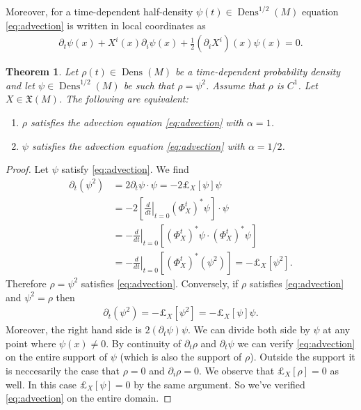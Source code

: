 \documentclass[letterpaper, 10 pt, conference]{ieeeconf}
\newtheorem{thm}{Theorem}[section]
\DeclareMathOperator{\Dens}{Dens}
\begin{document}
  Moreover, for a time-dependent half-density $\psi(t) \in \Dens^{1/2}(M)$
  equation \eqref{eq:advection} is written in local coordinates as
  \begin{align*}
    \partial_t \psi(x) 
    + X^i(x) \partial_i \psi(x) 
    + \frac{1}{2} (\partial_i X^i)(x) \psi(x) = 0.
  \end{align*}
  \begin{thm} \label{thm:advection}
    Let $\rho(t) \in \Dens(M)$ be a time-dependent probability density
    and let $\psi \in \Dens^{1/2}(M)$ be such that $\rho = \psi^2$.
    Assume that $\rho$ is $C^1$.
    Let $X \in \mathfrak{X}(M)$.
    The following are equivalent:
    \begin{enumerate}
      \item $\rho$ satisfies the advection equation \eqref{eq:advection} with $\alpha = 1$.
      \item $\psi$ satisfies the advection equation \eqref{eq:advection} with $\alpha = 1/2$.
    \end{enumerate}
  \end{thm}
  \begin{proof}
    Let $\psi$ satisfy \eqref{eq:advection}.
    We find
    \begin{align*}
      \partial_t (\psi^2) &= 2 \partial_t\psi \cdot \psi
      =-2 \pounds_X[\psi] \psi \\
      &= - 2 \left[ \left.\frac{d}{dt}\right|_{t=0}
         (\Phi_X^t)^* \psi \right] \cdot \psi \\
      &= - \left. \frac{d}{dt} \right|_{t=0}
        \left[ (\Phi_X^t)^* \psi \cdot (\Phi_X^t)^* \psi \right]\\
      &= - \left. \frac{d}{dt} \right|_{t=0}
        \left[ (\Phi_X^t)^* (\psi^2) \right] 
      = - \pounds_X[\psi^2].
    \end{align*}
    Therefore $\rho = \psi^2$ satisfies \eqref{eq:advection}.
    Conversely, if $\rho$ satisfies \eqref{eq:advection}
    and $\psi^2 = \rho$ then
    \begin{align*}
      \partial_t (\psi^2) = - \pounds_X[\psi^2] = - \pounds_X[\psi] \psi.
    \end{align*}
    Moreover, the right hand side is $2 (\partial_t \psi) \psi$.
    We can divide both side by $\psi$ at any point where $\psi(x) \neq 0$.
    By continuity of $\partial_t \rho$ and $\partial_t \psi$ we can
    verify \eqref{eq:advection} on the entire support of $\psi$
    (which is also the support of $\rho$).
    Outside the support it is neccesarily the case that
    $\rho = 0$ and  $\partial_i \rho = 0$.
    We observe that $\pounds_X[\rho] = 0$ as well.
    In this case $\pounds_X[\psi] = 0$ by the same argument.
    So we've verified \eqref{eq:advection} on the entire domain.
  \end{proof}
\end{document}
